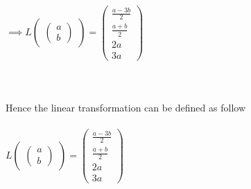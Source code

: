 \documentclass[45pt]{article}
\begin{document}
$\implies L\begin{pmatrix} \begin{pmatrix} a\\b \end{pmatrix} \end{pmatrix} = \begin{pmatrix} \frac{a-3b}{2}\\\frac{a+b}{2}\\2a\\3a \end{pmatrix}$
\\\\\\\\
Hence the linear transformation can be defined as follow\\\\
$ L\begin{pmatrix} \begin{pmatrix} a\\b \end{pmatrix} \end{pmatrix} = \begin{pmatrix} \frac{a-3b}{2}\\\frac{a+b}{2}\\2a\\3a \end{pmatrix}$
\end{document}
